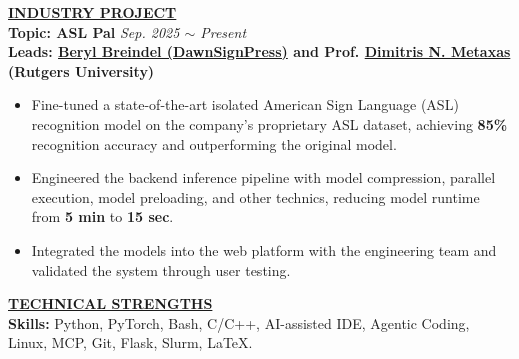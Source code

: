 \documentclass{article}
\begin{document}
\noindent \textbf{\underline{INDUSTRY PROJECT}} \\
\noindent \textbf{Topic: ASL Pal} \hfill \emph{Sep. 2025 $\sim$ Present} \\
\textbf{Leads: \href{https://www.linkedin.com/in/berylbreindel/}{\color{blue}Beryl Breindel (DawnSignPress)} and 
Prof. \href{https://people.cs.rutgers.edu/~dnm/}{\color{blue}Dimitris N. Metaxas} (Rutgers University)} 
\begin{itemize}[noitemsep,nolistsep,leftmargin=*]
\item Fine-tuned a state-of-the-art isolated American Sign Language (ASL) recognition model on the company's proprietary ASL dataset, achieving \textbf{85\%} recognition accuracy and outperforming the original model. 
\item Engineered the backend inference pipeline with model compression, parallel execution, model preloading, and other technics, reducing model runtime from \textbf{5 min} to \textbf{15 sec}.
\item Integrated the models into the web platform with the engineering team and validated the system through user testing.

\end{itemize}
\vspace{2pt}

\noindent \textbf{\underline{TECHNICAL STRENGTHS}} \\
\noindent \textbf{Skills:} Python, PyTorch, Bash, C/C++, AI-assisted IDE, Agentic Coding, Linux, MCP, Git, Flask, Slurm, \LaTeX.
\end{document}
